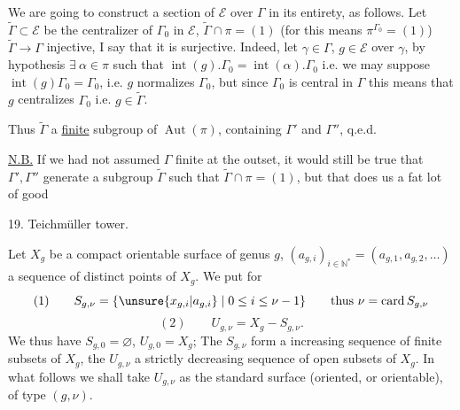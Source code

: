 We are going to construct a section of $\mathcal E$
over $\Gamma$ in  its entirety, as follows. Let $\widetilde\Gamma\subset\mathcal E$
be the centralizer of $\Gamma_0$ in $\mathcal E$, 
$\widetilde\Gamma\cap\pi=(1)$ (for this means $\pi^{\Gamma_0}=(1)$)
 $\widetilde\Gamma\longrightarrow\Gamma$ injective, I say
that it is surjective. Indeed, let
$\gamma\in\Gamma$, $g\in\mathcal E$ over $\gamma$, by hypothesis
$\exists\ \alpha\in\pi$ such that $\operatorname{int}(g).\Gamma_0=\operatorname{int}(\alpha).\Gamma_0$
i.e. we may suppose $\operatorname{int}(g)\Gamma_0=\Gamma_0$,  i.e. $g$ normalizes
$\Gamma_0$, but since $\Gamma_0$ is central in $\Gamma$
this means that $g$ centralizes $\Gamma_0$ i.e. $g\in\widetilde\Gamma$.

Thus $\widetilde\Gamma$ \inserted{$\simeq\Gamma$}  a \uline{finite} subgroup of $\operatorname{Aut}(\pi)$,
 containing $\Gamma'$ and $\Gamma''$, q.e.d.%

\uline{N.B.} If we had not assumed
$\Gamma$ finite at the outset, it would still be true that $\Gamma',\Gamma''$
generate a subgroup $\widetilde\Gamma$  such that
$\widetilde\Gamma\cap\pi=(1)$, but that does us a fat lot of good

19. Teichmüller tower.

Let  $X_g$ be a compact orientable surface of
genus $g$, 
\unsure{$[$|$]$} $(a_{g,i})_{i\in\mathbb N^*}=(a_{g,1},a_{g,2},\ldots)$ \unsure{$]$|$[$}
a sequence of
distinct points of $X_g$. We put for 
\[
(1)\qquad S_{g,\nu}=\{\unsure{x_{g,i}|a_{g,i}}\mid 0\leq i\leq\nu-1\}
\qquad\text{thus }\nu=\operatorname{card}S_{g,\nu}
\]
\[
(2)\qquad U_{g,\nu}=X_g-S_{g,\nu}.
\]
We thus have $S_{g,0}=\varnothing$, $U_{g,0}=X_g$; The $S_{g,\nu}$ form
a  increasing sequence of finite subsets of $X_g$,
the $U_{g,\nu}$ a strictly decreasing sequence of open subsets
of $X_g$. In what follows we shall take $U_{g,\nu}$ as
the standard surface (oriented, or orientable), of
type $(g,\nu)$.

